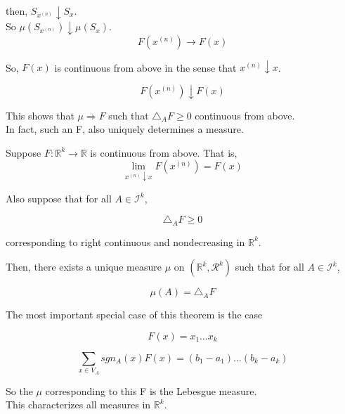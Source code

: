 \documentclass[11pt,fleqn]{book} %
\begin{document}
 then, $S_{x^{(n)}} \downarrow S_x$. \\

 So $\mu(S_{x^{(n)}}) \downarrow \mu(S_x)$. \\

 		$$ F(x^{(n)}) \rightarrow F(x) $$


 So, $F(x)$ is continuous from above in the sense that $x^{(n)} \downarrow x$. 

 		$$F(x^{(n)}) \downarrow F(x)$$

This shows that $\mu \Rightarrow F$ such that $\triangle_A F \geq 0$ continuous from above.\\

In fact, such an F, also uniquely determines a measure.


\begin{theorem}
 	Suppose $F: \mathbb{R}^k \rightarrow \mathbb{R}$ is continuous from above. That is, 
 			$$\lim_{x^{(n)} \downarrow x} F(x^{(n)}) = F(x)$$

 	Also suppose that for all $A \in \mathcal{I}^k$, 

 			$$\triangle_A F \geq 0 $$

 	corresponding to right continuous and nondecreasing in $\mathbb{R}^k$. 


 	Then,  there exists a unique measure $\mu$ on $(\mathbb{R}^k, \mathcal{R}^k)$ such that for all $A \in \mathcal{I}^k$, 

 			$$\mu(A) = \triangle_A F$$


 \end{theorem} 


The most important special case of this theorem is the case 


		$$ F(x) = x_1 \dots x_k$$

		$$\sum_{x\in V_A} sgn_A (x) F(x) = (b_1 - a_1)\dots (b_k - a_k) $$

So the $\mu$ corresponding to this F is the Lebesgue measure. \\


This characterizes all measures in $\mathbb{R}^k$. \\
\end{document}
